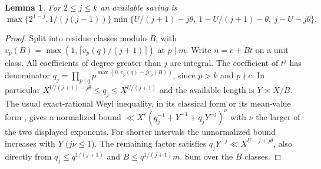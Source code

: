 \documentclass[11pt,letterpaper]{article}
\newtheorem{lemma}[lemma]{Lemma}
\theoremstyle{definition}
\newcommand{\eps}{\varepsilon}
\begin{document}
\begin{lemma}\label{lem:weyl}
For $2\le j\le k$ an available saving is
\[
 \max\{2^{1-j},1/(j(j-1))\}
 \min\{U/(j+1)-j\theta,\ 1-U/(j+1)-\theta,\ j-U-j\theta\}.
\]
\end{lemma}
\begin{proof}
Split into residue classes modulo $B$, with
$v_p(B)=\max(1,\lceil v_p(q)/(j+1)\rceil)$ at $p\mid m$.
Write $n=c+B t$ on a unit class. All coefficients of degree greater
than $j$ are integral. The coefficient of $t^j$ has denominator
$q_j=\prod_{p\mid q}p^{\max(0,v_p(q)-jv_p(B))}$, since
$p>k$ and $p\nmid c$. In particular
$X^{U/(j+1)-j\theta}\le q_j\le X^{U/(j+1)}$ and the available length
is $Y\asymp X/B$. The usual exact-rational Weyl inequality, in its
classical form or its mean-value form \cite[Theorem 5]{Bourgain}, gives
a normalized bound $\ll X^\eps(q_j^{-1}+Y^{-1}+q_jY^{-j})^\nu$
with $\nu$ the larger of the two displayed exponents. For shorter
intervals the unnormalized bound increases with $Y$
($j\nu\le1$). The remaining factor satisfies
$q_jY^{-j}\ll X^{U-j+j\theta}$, also directly from
$q_j\le q^{1/(j+1)}$ and $B\le q^{1/(j+1)}m$.
Sum over the $B$ classes.
\end{proof}
\end{document}
